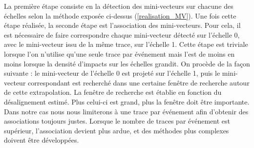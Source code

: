    La premi\`ere \'etape consiste en la d\'etection des mini-vecteurs sur chacune des \'echelles selon la m\'ethode expos\'ee ci-dessus (\ref{realisation_MV}). Une fois cette \'etape r\'ealis\'ee, la seconde \'etape est l'association des mini-vecteurs. Pour cela, il est n\'ecessaire de faire correspondre chaque mini-vecteur d\'etect\'e sur l'\'echelle 0, avec le mini-vecteur issu de la m\^eme trace, sur l'\'echelle 1. Cette \'etape est triviale lorsque l'on n'utilise qu'une seule trace par \'ev\'enement mais l'est de moins en moins lorsque la densit\'e d'impacts sur les \'echelles grandit. On proc\`ede de la façon suivante : le mini-vecteur de l'\'echelle 0 est projet\'e sur l'\'echelle 1, puis le mini-vecteur correspondant est recherch\'e dans une certaine fen\^etre de recherche autour de cette extrapolation. La fen\^etre de recherche est \'etablie en fonction du d\'esalignement estim\'e. Plus celui-ci est grand, plus la fenêtre doit être importante. Dans notre cas nous nous limiterons \`a une trace  par \'ev\'enement afin d'obtenir des associations toujours justes. Lorsque le nombre de traces par \'ev\'enement est sup\'erieur, l'association devient plus ardue, et des m\'ethodes plus complexes doivent \^etre d\'evelopp\'ees.
   
   \medskip
   
   
